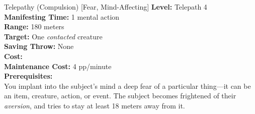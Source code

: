 {Telepathy (Compulsion) [Fear, Mind-Affecting]}
{
	\textbf{Level:}
	Telepath 4\\
	\textbf{Manifesting Time:}
	1 mental action\\
	\textbf{Range:}
	180  meters\\
	\textbf{Target:}
	One \emph{contacted} creature\\
	\textbf{Saving Throw:}
	None\\
	\textbf{Cost:}
	\\
	\textbf{Maintenance Cost:}
	4 pp/minute\\
	\textbf{Prerequisites:}
	\\
}
{
	You implant into the subject's mind a deep fear of a particular thing---it can be an item, creature, action, or event. The subject becomes frightened of their \emph{aversion}, and tries to stay at least 18 meters away from it.
}
